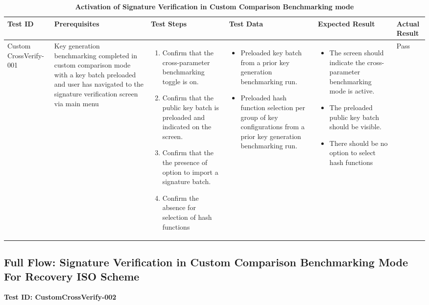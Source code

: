 \documentclass[]{final_report}
\theoremstyle{definition}
\begin{document}
\begin{longtable}{|p{1.5cm}|p{2.5cm}|p{3.5cm}|p{2.5cm}|p{3cm}|p{2cm}|}
  \caption{\textbf{Activation of Signature Verification in Custom Comparison Benchmarking mode}} 
  \hline
  \textbf{Test ID} & \textbf{Prerequisites} & \textbf{Test Steps} & \textbf{Test Data} & \textbf{Expected Result} & \textbf{Actual Result} \\
    \hline
Custom
CrossVerify-001 & Key generation benchmarking completed in custom comparison mode with a key batch preloaded and user has navigated to the signature verification screen via main menu &
\begin{enumerate}
\item Confirm that the cross-parameter benchmarking toggle is on.
\item Confirm that the public key batch is preloaded and indicated on the screen.
\item Confirm that the the presence of option to import a signature batch.
\item Confirm the absence for selection of hash functions
\end{enumerate} &
\begin{itemize}
\item Preloaded key batch from a prior key generation benchmarking run.
\item Preloaded hash function selection per group of key configurations from a prior key generation benchmarking run.
\end{itemize} &
\begin{itemize}
\item The screen should indicate the cross-parameter benchmarking mode is active.
\item The preloaded public  key batch should be visible.
\item There should be no option to select hash functions
\end{itemize} &Pass \\
\hline
  
\end{longtable}

\subsection*{Full Flow: Signature Verification in Custom Comparison Benchmarking Mode For Recovery ISO Scheme}

\textbf{Test ID: CustomCrossVerify-002}
\end{document}
